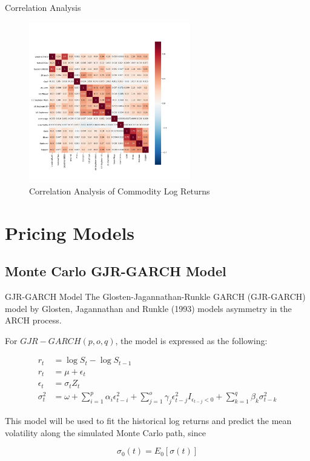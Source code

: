\documentclass[8pt]{beamer}
\numberwithin{equation}{section}
\begin{document}
\begin{frame}{Correlation Analysis}

\begin{figure} [!ht]
	\includegraphics[width=7cm]{logRtCorrelation.jpg} %
	\caption{Correlation Analysis of Commodity Log Returns} %
	\label{logRtCorrelation} %
\end{figure}
\end{frame}

\section{Pricing Models}

\frame{\tableofcontents[currentsection]}

\subsection{Monte Carlo GJR-GARCH Model}

\begin{frame}{GJR-GARCH Model}
The Glosten-Jagannathan-Runkle GARCH (GJR-GARCH) model by Glosten, Jagannathan and Runkle (1993) models asymmetry in the ARCH process.

For $GJR-GARCH(p, o, q)$, the model is expressed as the following:

\begin{equation}
\begin{aligned}
r_t &= \log S_t - \log S_{t-1}
\\
r_t &= \mu +\epsilon_t
\\
\epsilon_t &= \sigma_t Z_t
\\
\sigma_t^2 &= \omega + \sum_{i=1}^p {\alpha_i \epsilon_{t-i}^2} + \sum_{j=1}^o {\gamma_j \epsilon_{t-j}^2 I_{\epsilon_{t-j} < 0}} + \sum_{k=1}^q {\beta_k \sigma_{t-k}^2}
\end{aligned}
\end{equation}

This model will be used to fit the historical log returns and predict the mean volatility along the simulated Monte Carlo path, since

\begin{equation}
\sigma_0(t) = E_0[\sigma(t)]
\end{equation}

\end{frame}
\end{document}
